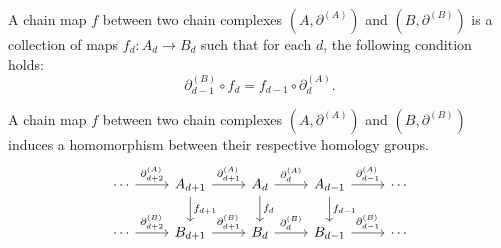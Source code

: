 \begin{definition}
	A chain map $f$ between two chain complexes $(A, \partial^{(A)})$ and $(B,\partial
	^{(B)})$ is a collection of maps $f_{d}: A_{d} \rightarrow B_{d}$ such that for
	each $d$, the following condition holds:
	\begin{equation}
		\partial^{(B)}_{d-1}\circ f_{d} = f_{d-1}\circ \partial^{(A)}_{d}.
	\end{equation}
\end{definition}

\begin{theorem}{\cite[\S 1.3.1]{Weibel1994}}
	\label{chainmaps} A chain map $f$ between two chain complexes $(A, \partial^{(A)}
	)$ and $(B, \partial^{(B)})$ induces a homomorphism between their respective homology
	groups.
	\begin{equation}
		\begin{tikzcd}
			\cdots \arrow[r, "\partial^{(A)}_{d+2}"] & A_{d+1} \arrow[r, "\partial^{(A)}_{d+1}"]
			\arrow[d, "f_{d+1}"] & A_d \arrow[r, "\partial^{(A)}_{d}"] \arrow[d, "f_d"]
			& A_{d-1} \arrow[r, "\partial^{(A)}_{d-1}"] \arrow[d, "f_{d-1}"] & \cdots \\
			\cdots \arrow[r, "\partial^{(B)}_{d+2}"] & B_{d+1} \arrow[r, "\partial^{(B)}_{d+1}"]
			& B_d \arrow[r, "\partial^{(B)}_d"] & B_{d-1} \arrow[r, "\partial^{(B)}_{d-1}"]
			& \cdots
		\end{tikzcd}
	\end{equation}
\end{theorem}

